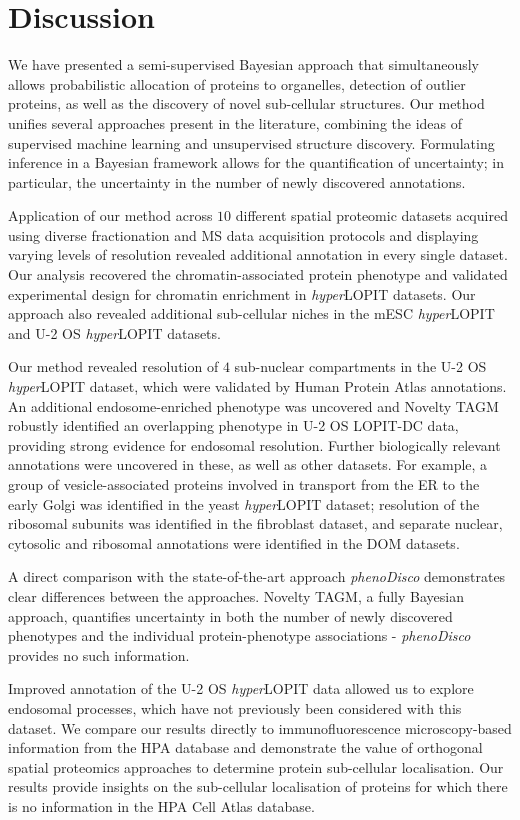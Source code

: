 \documentclass[12pt,english]{article}
\begin{document}
\section*{Discussion}
We have presented a semi-supervised Bayesian approach that simultaneously allows probabilistic allocation of proteins to organelles, detection of outlier proteins, as well as the discovery of novel sub-cellular structures. Our method unifies several approaches present in the literature, combining the ideas of supervised machine learning and unsupervised structure discovery. Formulating inference in a Bayesian framework allows for the quantification of uncertainty; in particular, the uncertainty in the number of newly discovered annotations.

Application of our method across $10$ different spatial proteomic datasets acquired using diverse fractionation and MS data acquisition protocols and displaying varying levels of resolution revealed additional annotation in every single dataset. Our analysis recovered the chromatin-associated protein phenotype and validated experimental design for chromatin enrichment in \textit{hyper}LOPIT datasets. Our approach also revealed additional sub-cellular niches in the mESC \textit{hyper}LOPIT and U-2 OS \textit{hyper}LOPIT datasets.

Our method revealed resolution of $4$ sub-nuclear compartments in the U-2 OS \textit{hyper}LOPIT dataset, which were validated by Human Protein Atlas annotations. An additional endosome-enriched phenotype was uncovered and Novelty TAGM robustly identified an overlapping phenotype in U-2 OS LOPIT-DC data, providing strong evidence for endosomal resolution. Further biologically relevant annotations were uncovered in these, as well as other datasets. For example, a group of vesicle-associated proteins involved in transport from the ER to the early Golgi was identified in the yeast \textit{hyper}LOPIT dataset; resolution of the ribosomal subunits was identified in the fibroblast dataset, and separate nuclear, cytosolic and ribosomal annotations were identified in the DOM datasets.

A direct comparison with the state-of-the-art approach \textit{phenoDisco} demonstrates clear differences between the approaches. Novelty TAGM, a fully Bayesian approach, quantifies uncertainty in both the number of newly discovered phenotypes and the individual protein-phenotype associations - \textit{phenoDisco} provides no such information.

Improved annotation of the U-2 OS \textit{hyper}LOPIT data allowed us to explore endosomal processes, which have not previously been considered with this dataset. We compare our results directly to immunofluorescence microscopy-based information from the HPA database and demonstrate the value of orthogonal spatial proteomics approaches to determine protein sub-cellular localisation. Our results provide insights on the sub-cellular localisation of proteins for which there is no information in the HPA Cell Atlas database. 
\end{document}
